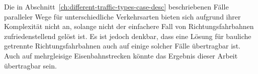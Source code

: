 \documentclass[../main/thesis.tex]{subfiles}
\begin{document}
Die in Abschnitt~\ref{ch:different-traffic-types-case-desc} beschriebenen Fälle paralleler Wege für unterschiedliche Verkehrsarten bieten sich aufgrund ihrer Komplexität nicht an, solange nicht der einfachere Fall von Richtungsfahrbahnen zufriedenstellend gelöst ist.
Es ist jedoch denkbar, dass eine Lösung für bauliche getrennte Richtungsfahrbahnen auch auf einige solcher Fälle übertragbar ist.
Auch auf mehrgleisige Eisenbahnstrecken könnte das Ergebnis dieser Arbeit übertragbar sein.







\onlyinsubfile{\listoffigures}
\end{document}
